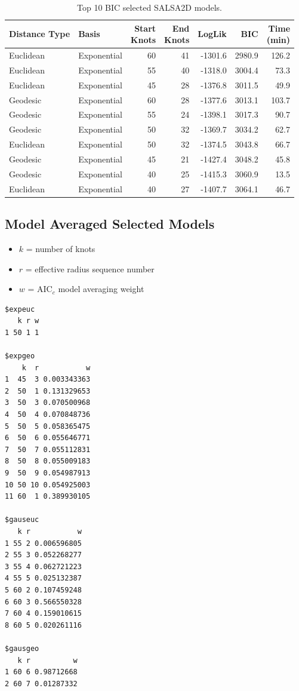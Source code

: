 \begin{table}[!htb]
    \centering
\begin{tabular}{|l|l|r|r|r|r|r|}
\hline
Distance Type & Basis & \makecell[r]{Start \\Knots} & \makecell[l]{End \\Knots} & LogLik & BIC & \makecell[l]{Time \\(min)}\\
\hline
Euclidean & Exponential & 60 & 41 & -1301.6 & 2980.9 & 126.2\\
\hline
Euclidean & Exponential & 55 & 40 & -1318.0 & 3004.4 & 73.3\\
\hline
Euclidean & Exponential & 45 & 28 & -1376.8 & 3011.5 & 49.9\\
\hline
Geodesic & Exponential & 60 & 28 & -1377.6 & 3013.1 & 103.7\\
\hline
Geodesic & Exponential & 55 & 24 & -1398.1 & 3017.3 & 90.7\\
\hline
Geodesic & Exponential & 50 & 32 & -1369.7 & 3034.2 & 62.7\\
\hline
Euclidean & Exponential & 50 & 32 & -1374.5 & 3043.8 & 66.7\\
\hline
Geodesic & Exponential & 45 & 21 & -1427.4 & 3048.2 & 45.8\\
\hline
Geodesic & Exponential & 40 & 25 & -1415.3 & 3060.9 & 13.5\\
\hline
Euclidean & Exponential & 40 & 27 & -1407.7 & 3064.1 & 46.7\\
\hline
\end{tabular}
\caption{Top 10 BIC selected SALSA2D models.}
    \label{tab:my_label}
\end{table}

\clearpage

\subsection*{Model Averaged Selected Models}

\begin{itemize}
    \item $k$ = number of knots
    \item $r$ = effective radius sequence number
    \item $w$ = AIC$_c$ model averaging weight
\end{itemize}

\begin{verbatim}
$expeuc
   k r w
1 50 1 1

$expgeo
    k  r           w
1  45  3 0.003343363
2  50  1 0.131329653
3  50  3 0.070500968
4  50  4 0.070848736
5  50  5 0.058365475
6  50  6 0.055646771
7  50  7 0.055112831
8  50  8 0.055009183
9  50  9 0.054987913
10 50 10 0.054925003
11 60  1 0.389930105

$gauseuc
   k r           w
1 55 2 0.006596805
2 55 3 0.052268277
3 55 4 0.062721223
4 55 5 0.025132387
5 60 2 0.107459248
6 60 3 0.566550328
7 60 4 0.159010615
8 60 5 0.020261116

$gausgeo
   k r          w
1 60 6 0.98712668
2 60 7 0.01287332
\end{verbatim}

